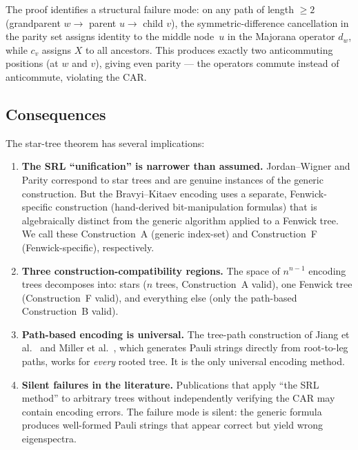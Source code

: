 The proof identifies a structural failure mode: on any path of length
$\geq 2$ (grandparent $w \to$ parent $u \to$ child $v$), the
symmetric-difference cancellation in the parity set assigns identity to
the middle node~$u$ in the Majorana operator $d_w$, while $c_v$ assigns
$X$ to all ancestors.  This produces exactly two anticommuting
positions (at $w$ and $v$), giving even parity --- the operators
commute instead of anticommute, violating the CAR.

\subsection{Consequences}

The star-tree theorem has several implications:

\begin{enumerate}
  \item \textbf{The SRL ``unification'' is narrower than assumed.}
    Jordan--Wigner and Parity correspond to star trees and are genuine
    instances of the generic construction.  But the Bravyi--Kitaev
    encoding uses a separate, Fenwick-specific construction
    (hand-derived bit-manipulation formulas) that is algebraically
    distinct from the generic algorithm applied to a Fenwick tree.  We
    call these Construction~A (generic index-set) and Construction~F
    (Fenwick-specific), respectively.

  \item \textbf{Three construction-compatibility regions.}  The space
    of $n^{n-1}$ encoding trees decomposes into: stars ($n$ trees,
    Construction~A valid), one Fenwick tree (Construction~F valid),
    and everything else (only the path-based Construction~B valid).

  \item \textbf{Path-based encoding is universal.}  The tree-path
    construction of Jiang et al.~\cite{jiang2020} and Miller et
    al.~\cite{miller2023bonsai}, which generates Pauli strings
    directly from root-to-leg paths, works for \emph{every} rooted
    tree.  It is the only universal encoding method.

  \item \textbf{Silent failures in the literature.}  Publications that
    apply ``the SRL method'' to arbitrary trees without independently
    verifying the CAR may contain encoding errors.  The failure mode
    is silent: the generic formula produces well-formed Pauli strings
    that appear correct but yield wrong eigenspectra.
\end{enumerate}

